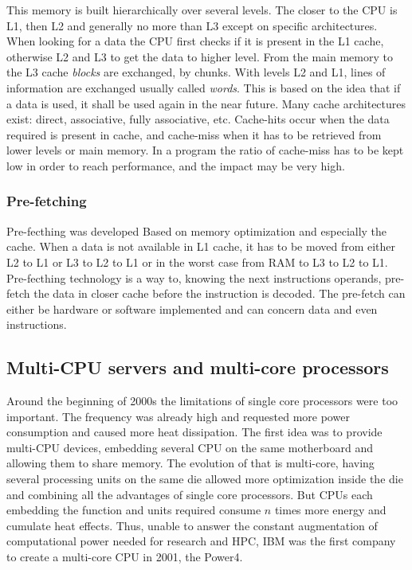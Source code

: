 This memory is built hierarchically over several levels. 
The closer to the CPU is L1, then L2 and generally no more than L3 except on specific architectures. 
When looking for a data the CPU first checks if it is present in the L1 cache, otherwise L2 and L3 to get the data to higher level. 
From the main memory to the L3 cache \textit{blocks} are exchanged, by chunks. 
With levels L2 and L1, lines of information are exchanged usually called \textit{words}.
This is based on the idea that if a data is used, it shall be used again in the near future.
Many cache architectures exist: direct, associative, fully associative, etc. 
Cache-hits occur when the data required is present in cache, and cache-miss when it has to be retrieved from lower levels or main memory. 
In a program the ratio of cache-miss has to be kept low in order to reach performance, and the impact may be very high.



\subsubsection{Pre-fetching} 
Pre-fecthing was developed Based on memory optimization and especially the cache.
When a data is not available in L1 cache, it has to be moved from either L2 to L1 or L3 to L2 to L1 or in the worst case from RAM to L3 to L2 to L1. 
Pre-fecthing technology is a way to, knowing the next instructions operands, pre-fetch the data in closer cache before the instruction is decoded. 
The pre-fetch can either be hardware or software implemented and can concern data and even instructions.



\subsection{Multi-CPU servers and multi-core processors}
Around the beginning of 2000s the limitations of single core processors were too important. 
The frequency was already high and requested more power consumption and caused more heat dissipation. 
The first idea was to provide multi-CPU devices, embedding several CPU on the same motherboard and allowing them to share memory. 
The evolution of that is multi-core, having several processing units on the same die allowed more optimization inside the die and combining all the advantages of single core processors.
But CPUs each embedding the function and units required consume $n$ times more energy and cumulate heat effects.
Thus, unable to answer the constant augmentation of computational power needed for research and HPC, IBM was the first company to create a multi-core CPU in 2001, the Power4. 


